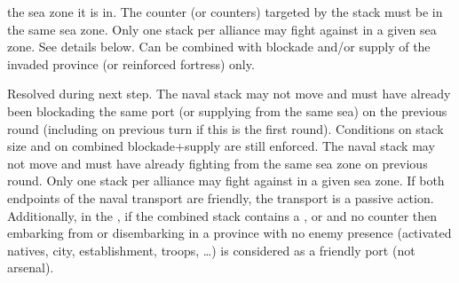 the sea zone it is in. The \corsaire counter (or counters) targeted by the
stack must be in the same sea zone. Only one stack per alliance may fight
against \corsaire in a given sea zone.
 See details below. Can be combined with blockade
and/or supply of the invaded province (or reinforced fortress) only.


\label{chMilitary:Moves:Passive Naval}
\bparag[Exploration.] Resolved during next step.
 The naval stack may not move and
must have already been blockading the same port (or supplying from the same
sea) on the previous round (including on previous turn if this is the first
round). Conditions on stack size and on combined blockade+supply are still
enforced.
 The naval stack may not move and
must have already fighting \corsaire from the same sea zone on previous
round. Only one stack per alliance may fight against \corsaire in a given sea
zone.
 If both endpoints of the naval transport
are friendly, the transport is a passive action. Additionally, in the \ROTW,
if the combined stack contains a \LeaderE, \LeaderC or \LeaderGov and no \ARMY
counter then embarking from or disembarking in a province with no enemy
presence (activated natives, city, establishment, troops, \ldots) is
considered as a friendly port (not arsenal).

